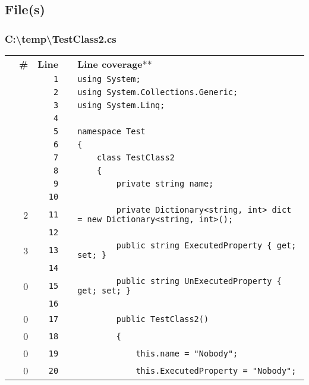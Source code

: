 \documentclass[a4paper,landscape,10pt]{article}
\begin{document}
\subsection{File(s)}
\subsubsection{C:\textbackslash temp\textbackslash TestClass2.cs}
\begin{longtable}[l]{lrrll}
 & \textbf{\#} & \textbf{Line} & & \textbf{Line coverage}** \\
\cellcolor{gray} &  & \verb~1~ & & \verb~using System;~\\
\cellcolor{gray} &  & \verb~2~ & & \verb~using System.Collections.Generic;~\\
\cellcolor{gray} &  & \verb~3~ & & \verb~using System.Linq;~\\
\cellcolor{gray} &  & \verb~4~ & & \verb~~\\
\cellcolor{gray} &  & \verb~5~ & & \verb~namespace Test~\\
\cellcolor{gray} &  & \verb~6~ & & \verb~{~\\
\cellcolor{gray} &  & \verb~7~ & & \verb~    class TestClass2~\\
\cellcolor{gray} &  & \verb~8~ & & \verb~    {~\\
\cellcolor{gray} &  & \verb~9~ & & \verb~        private string name;~\\
\cellcolor{gray} &  & \verb~10~ & & \verb~~\\
\cellcolor{green} & 2 & \verb~11~ & & \verb~        private Dictionary<string, int> dict = new Dictionary<string, int>();~\\
\cellcolor{gray} &  & \verb~12~ & & \verb~~\\
\cellcolor{green} & 3 & \verb~13~ & & \verb~        public string ExecutedProperty { get; set; }~\\
\cellcolor{gray} &  & \verb~14~ & & \verb~~\\
\cellcolor{red} & 0 & \verb~15~ & & \verb~        public string UnExecutedProperty { get; set; }~\\
\cellcolor{gray} &  & \verb~16~ & & \verb~~\\
\cellcolor{red} & 0 & \verb~17~ & & \verb~        public TestClass2()~\\
\cellcolor{red} & 0 & \verb~18~ & & \verb~        {~\\
\cellcolor{red} & 0 & \verb~19~ & & \verb~            this.name = "Nobody";~\\
\cellcolor{red} & 0 & \verb~20~ & & \verb~            this.ExecutedProperty = "Nobody";~\\

\end{longtable}
\end{document}
